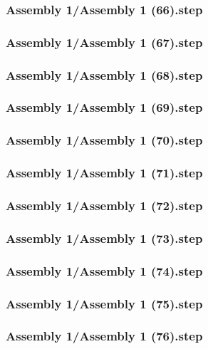 \documentclass[a4paper,12pt]{article}
\begin{document}
\subsubsection{Assembly 1/Assembly 1 (66).step}

\subsubsection{Assembly 1/Assembly 1 (67).step}

\subsubsection{Assembly 1/Assembly 1 (68).step}

\subsubsection{Assembly 1/Assembly 1 (69).step}

\subsubsection{Assembly 1/Assembly 1 (70).step}

\subsubsection{Assembly 1/Assembly 1 (71).step}

\subsubsection{Assembly 1/Assembly 1 (72).step}

\subsubsection{Assembly 1/Assembly 1 (73).step}

\subsubsection{Assembly 1/Assembly 1 (74).step}

\subsubsection{Assembly 1/Assembly 1 (75).step}

\subsubsection{Assembly 1/Assembly 1 (76).step}

\end{document}

